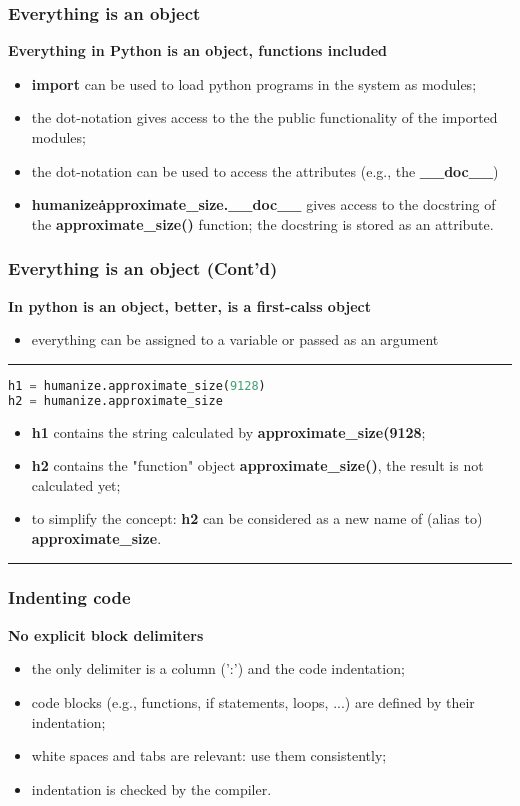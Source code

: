 \subsubsection{Everything is an object}
\textbf{Everything in Python is an object, functions included}
\begin{itemize}
	\item \textbf{import} can be used to load python programs in the system as modules;
	\item the dot-notation gives access to the the public functionality of the imported modules;
	\item the dot-notation can be used to access the attributes (e.g., the \textbf{\_\_doc\_\_})
	\item \textbf{humanize\.approximate\_size.\_\_doc\_\_} gives access to the docstring of the \textbf{approximate\_size()} function; the docstring is stored as an attribute.
\end{itemize}

\subsubsection{Everything is an object (Cont'd)}
\textbf{In python is an object, better, is a \textbf{first-calss object}}
\begin{itemize}
	\item everything can be assigned to a variable or passed as an argument
\end{itemize}
\hrule
\begin{lstlisting}[language=Python]
h1 = humanize.approximate_size(9128)
h2 = humanize.approximate_size
\end{lstlisting}	
\begin{itemize}
	\item \textbf{h1} contains the string calculated by \textbf{approximate\_size(9128};
	\item \textbf{h2} contains the "function" object \textbf{approximate\_size()}, the result is not calculated yet;
	\item to simplify the concept: \textbf{h2} can be considered as a new name of (alias to) \textbf{approximate\_size}.
\end{itemize}
\hrule

\subsubsection{Indenting code}
\textbf{No explicit block delimiters}
\begin{itemize}
	\item the only delimiter is a column (':') and the code indentation;
	\item code blocks (e.g., functions, if statements, loops, ...) are defined by their indentation;
	\item white spaces and tabs are relevant: use them consistently;
	\item indentation is checked by the compiler.
\end{itemize}

